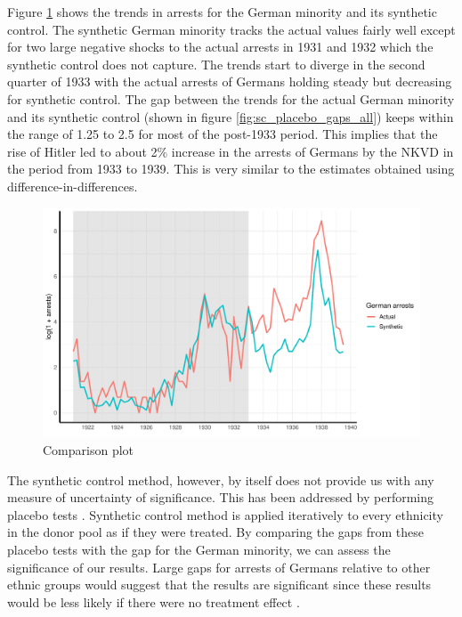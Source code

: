 Figure \ref{fig_sc_comp_plot} shows the trends in arrests for the German minority and its synthetic control. The synthetic German minority tracks the actual values fairly well except for two large negative shocks to the actual arrests in 1931 and 1932 which the synthetic control does not capture. The trends start to diverge in the second quarter of 1933 with the actual arrests of Germans holding steady but decreasing for synthetic control. 
The gap between the trends for the actual German minority and its synthetic control (shown in figure \ref{fig:sc_placebo_gaps_all}) keeps within the range of 1.25 to 2.5 for most of the post-1933 period. This implies that the rise of Hitler led to about  2\% increase in the arrests of Germans by the NKVD  in the period from 1933 to 1939. This is very similar to the estimates obtained using difference-in-differences. 
\begin{figure}[h]
\centering
\includegraphics[width=\textwidth]{plots/synthetic_control/until_pact/comparison_plot.pdf}
\caption{Comparison plot}
\label{fig_sc_comp_plot}
\end{figure}


The synthetic control method, however, by itself does not provide us with any measure of uncertainty of significance. This has been addressed by performing placebo tests \citep{abadie_synthetic_2010}. Synthetic control method is applied iteratively to every ethnicity in the donor pool
as if they were treated. By comparing the gaps from these placebo tests with the gap for the German minority, we can assess the
significance of our results.
Large gaps for arrests of Germans relative to other ethnic groups would suggest that the results are significant since these results would be less likely if there were no treatment effect . 

